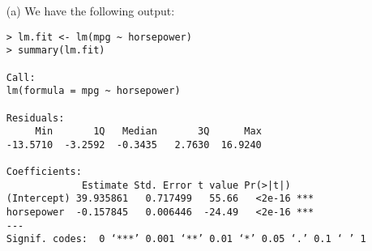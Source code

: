 
\begin{itemize}
    \item[(a)] We have the following output:
        \small\begin{verbatim}
> lm.fit <- lm(mpg ~ horsepower)
> summary(lm.fit)

Call:
lm(formula = mpg ~ horsepower)

Residuals:
     Min       1Q   Median       3Q      Max 
-13.5710  -3.2592  -0.3435   2.7630  16.9240 

Coefficients:
             Estimate Std. Error t value Pr(>|t|)    
(Intercept) 39.935861   0.717499   55.66   <2e-16 ***
horsepower  -0.157845   0.006446  -24.49   <2e-16 ***
---
Signif. codes:  0 ‘***’ 0.001 ‘**’ 0.01 ‘*’ 0.05 ‘.’ 0.1 ‘ ’ 1


\end{verbatim}
\end{itemize}
